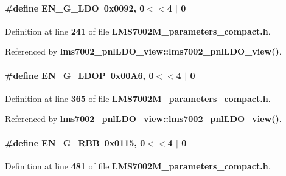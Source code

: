 \paragraph[{E\+N\+\_\+\+G\+\_\+\+L\+DO}]{\setlength{\rightskip}{0pt plus 5cm}\#define E\+N\+\_\+\+G\+\_\+\+L\+DO~0x0092, 0$<$$<$4 $\vert$  0}\label{LMS7002M__parameters__compact_8h_a919a0521ec6e783ea2a3edb7c93f58b6}


Definition at line {\bf 241} of file {\bf L\+M\+S7002\+M\+\_\+parameters\+\_\+compact.\+h}.



Referenced by {\bf lms7002\+\_\+pnl\+L\+D\+O\+\_\+view\+::lms7002\+\_\+pnl\+L\+D\+O\+\_\+view()}.

\paragraph[{E\+N\+\_\+\+G\+\_\+\+L\+D\+OP}]{\setlength{\rightskip}{0pt plus 5cm}\#define E\+N\+\_\+\+G\+\_\+\+L\+D\+OP~0x00\+A6, 0$<$$<$4 $\vert$  0}\label{LMS7002M__parameters__compact_8h_afd487f2bfa78035c6eee0f5d66d9c64c}


Definition at line {\bf 365} of file {\bf L\+M\+S7002\+M\+\_\+parameters\+\_\+compact.\+h}.



Referenced by {\bf lms7002\+\_\+pnl\+L\+D\+O\+\_\+view\+::lms7002\+\_\+pnl\+L\+D\+O\+\_\+view()}.

\paragraph[{E\+N\+\_\+\+G\+\_\+\+R\+BB}]{\setlength{\rightskip}{0pt plus 5cm}\#define E\+N\+\_\+\+G\+\_\+\+R\+BB~0x0115, 0$<$$<$4 $\vert$  0}\label{LMS7002M__parameters__compact_8h_a9de1ecae44ff25fef6f1eaba105290be}


Definition at line {\bf 481} of file {\bf L\+M\+S7002\+M\+\_\+parameters\+\_\+compact.\+h}.



